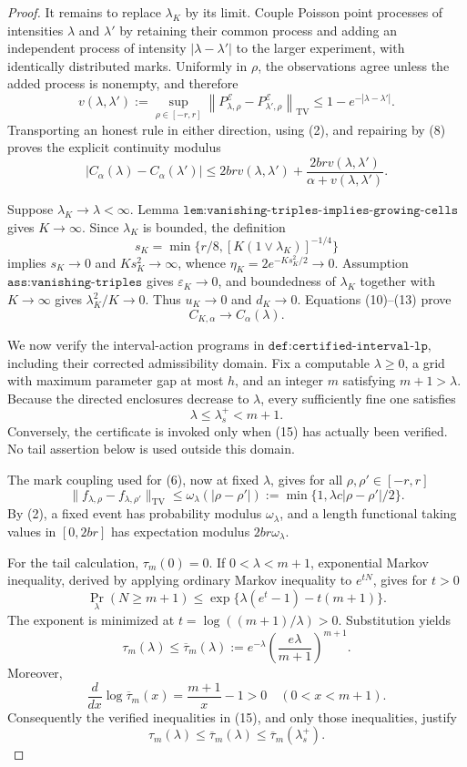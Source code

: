 \documentclass{article}
\begin{document}
\begin{proof}
It remains to replace \(\lambda_K\) by its limit.  Couple Poisson point
processes of intensities \(\lambda\) and \(\lambda'\) by retaining their
common process and adding an independent process of intensity
\(|\lambda-\lambda'|\) to the larger experiment, with identically
distributed marks.  Uniformly in \(\rho\), the observations agree unless
the added process is nonempty, and therefore
\[
 v(\lambda,\lambda')
 :=\sup_{\rho\in[-r,r]}
 \left\lVert P^{\mathcal E}_{\lambda,\rho}
 -P^{\mathcal E}_{\lambda',\rho}\right\rVert_{\mathrm{TV}}
 \leq1-e^{-|\lambda-\lambda'|}.
 \tag{12}
\]
Transporting an honest rule in either direction, using (2), and repairing
by (8) proves the explicit continuity modulus
\[
 |C_\alpha(\lambda)-C_\alpha(\lambda')|
 \leq2brv(\lambda,\lambda')
 +\frac{2brv(\lambda,\lambda')}{\alpha+v(\lambda,\lambda')}.
 \tag{13}
\]

Suppose \(\lambda_K\to\lambda<\infty\).  Lemma
\(\texttt{lem:vanishing-triples-implies-growing-cells}\) gives
\(K\to\infty\).  Since \(\lambda_K\) is bounded, the definition
\[
 s_K=\min\{r/8,[K(1\vee\lambda_K)]^{-1/4}\}
\]
implies \(s_K\to0\) and \(Ks_K^2\to\infty\), whence
\(\eta_K=2e^{-Ks_K^2/2}\to0\).  Assumption
\(\texttt{ass:vanishing-triples}\) gives \(\varepsilon_K\to0\), and
boundedness of \(\lambda_K\) together with \(K\to\infty\) gives
\(\lambda_K^2/K\to0\).  Thus \(u_K\to0\) and \(d_K\to0\).  Equations
(10)--(13) prove
\[
 C_{K,\alpha}\longrightarrow C_\alpha(\lambda).
 \tag{14}
\]

We now verify the interval-action programs in
\(\texttt{def:certified-interval-lp}\), including their corrected
admissibility domain.  Fix a computable \(\lambda\geq0\), a grid with
maximum parameter gap at most \(h\), and an integer \(m\) satisfying
\(m+1>\lambda\).  Because the directed enclosures decrease to
\(\lambda\), every sufficiently fine one satisfies
\[
 \lambda\leq\lambda_s^+<m+1.
 \tag{15}
\]
Conversely, the certificate is invoked only when (15) has actually been
verified.  No tail assertion below is used outside this domain.

The mark coupling used for (6), now at fixed \(\lambda\), gives for all
\(\rho,\rho'\in[-r,r]\)
\[
 \lVert f_{\lambda,\rho}-f_{\lambda,\rho'}\rVert_{\mathrm{TV}}
 \leq\omega_\lambda(|\rho-\rho'|)
 :=\min\{1,\lambda c|\rho-\rho'|/2\}.
 \tag{16}
\]
By (2), a fixed event has probability modulus \(\omega_\lambda\), and a
length functional taking values in \([0,2br]\) has expectation modulus
\(2br\omega_\lambda\).

For the tail calculation, \(\tau_m(0)=0\).  If
\(0<\lambda<m+1\), exponential Markov inequality, derived by applying
ordinary Markov inequality to \(e^{tN}\), gives for \(t>0\)
\[
 \Pr_\lambda(N\geq m+1)
 \leq\exp\{\lambda(e^t-1)-t(m+1)\}.
 \tag{17}
\]
The exponent is minimized at
\(t=\log((m+1)/\lambda)>0\).  Substitution yields
\[
 \tau_m(\lambda)
 \leq\overline\tau_m(\lambda)
 :=e^{-\lambda}\left(\frac{e\lambda}{m+1}\right)^{m+1}.
 \tag{18}
\]
Moreover,
\[
 \frac{d}{dx}\log\overline\tau_m(x)=\frac{m+1}{x}-1>0
 \quad(0<x<m+1).
 \tag{19}
\]
Consequently the verified inequalities in (15), and only those
inequalities, justify
\[
 \tau_m(\lambda)
 \leq\overline\tau_m(\lambda)
 \leq\overline\tau_m(\lambda_s^+).
 \tag{20}
\]


\end{proof}
\end{document}
